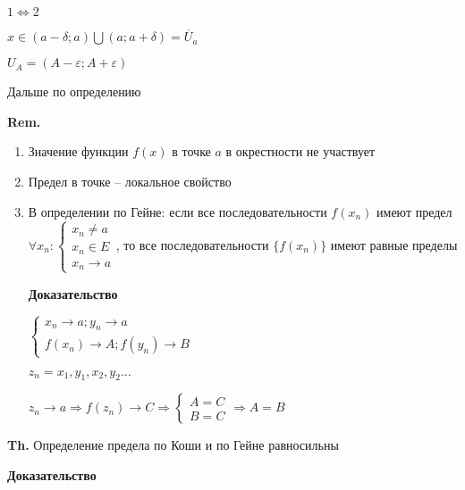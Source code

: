 \documentclass[14pt, letter paper]{article}
\begin{document}
$1 \Leftrightarrow 2$

    $x \in (a - \delta; a) \bigcup (a; a + \delta) = \mathring{U_a}$

    $U_A = (A - \varepsilon; A + \varepsilon)$

    Дальше по определению

\vspace{5mm}

\textbf{Rem.} 

\begin{enumerate}
    \item Значение функции $f(x)$ в точке $a$ в окрестности не участвует
    \item Предел в точке -- локальное свойство
    \item В определении по Гейне: если все последовательности $f(x_n)$ имеют предел $\forall x_n : \begin{cases}
        x_n \neq a \\
        x_n \in E \\
        x_n \rightarrow a
    \end{cases}$, то все последовательности $\{f(x_n)\}$ имеют равные пределы

    \begin{center}
        \textbf{Доказательство}
    \end{center}

    $\begin{cases}
        x_n \rightarrow a; y_n \rightarrow a \\
        f(x_n) \rightarrow A; f(y_n) \rightarrow B
    \end{cases}$

    $z_n = x_1, y_1, x_2, y_2 \ldots$

    $z_n \rightarrow a \Rightarrow f(z_n) \rightarrow C \Rightarrow \begin{cases}
        A = C \\
        B = C
    \end{cases} \Rightarrow A = B$
\end{enumerate}

\textbf{Th.} Определение предела по Коши и по Гейне равносильны

\begin{center}
    \textbf{Доказательство}
\end{center}
\end{document}
